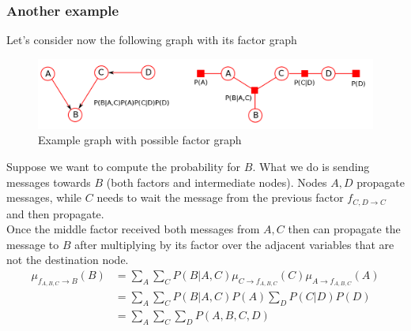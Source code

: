 \subsubsection{Another example}
Let's consider now the following graph with its factor graph
\begin{figure}[H]
	\centering
	\includegraphics[scale=0.3]{
		images/09_BayesianNetworksInference_exampleInferenceEvidence.png
	}
	\caption{Example graph with possible factor graph}
	\label{fig:inference_graph_evidence}
\end{figure}
Suppose we want to compute the probability for $B$. What we do is sending
messages towards $B$ (both factors and intermediate nodes). Nodes $A, D$ propagate
messages, while $C$ needs to wait the message from the previous factor
$f_{C, D \rightarrow C}$ and then propagate.\\ Once the middle factor received
both messages from $A, C$ then can propagate the message to $B$ after
multiplying by its factor over the adjacent variables that are not the
destination node.
\begin{align*}
	\mu_{f_{A, B, C} \rightarrow B}(B) & = \sum_{A}\sum_{C}P(B|A, C) \mu_{C \rightarrow f_{A, B, C}}(C) \mu_{A \rightarrow f_{A, B, C}}(A) \\
	                                   & = \sum_{A}\sum_{C}P(B|A, C) P(A) \sum_{D}P(C|D) P(D)                                              \\
	                                   & = \sum_{A}\sum_{C}\sum_{D}P(A, B, C, D)
\end{align*}

